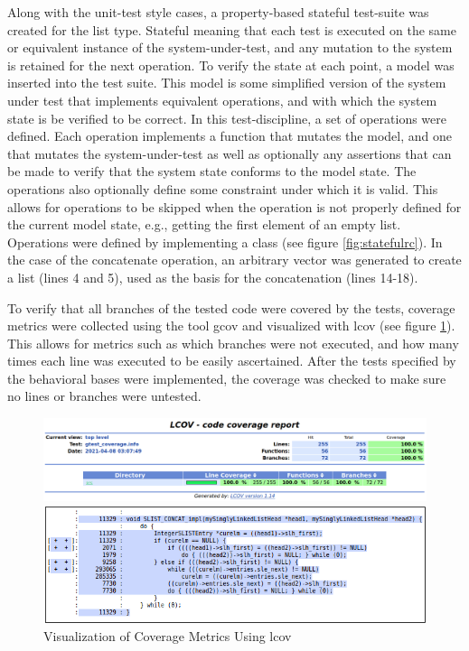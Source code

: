 Along with the unit-test style cases, a property-based stateful test-suite was created for the list type. Stateful meaning that each test is executed on the same or equivalent instance of the system-under-test, and any mutation to the system is retained for the next operation. To verify the state at each point, a model was inserted into the test suite. This model is some simplified version of the system under test that implements equivalent operations, and with which the system state is be verified to be correct. In this test-discipline, a set of operations were defined. Each operation implements a function that mutates the model, and one that mutates the system-under-test as well as optionally any assertions that can be made to verify that the system state conforms to the model state. The operations also optionally define some constraint under which it is valid. This allows for operations to be skipped when the operation is not properly defined for the current model state, e.g., getting the first element of an empty list. Operations were defined by implementing a class (see figure \ref{fig:statefulrc}). In the case of the concatenate operation, an arbitrary vector was generated to create a list (lines 4 and 5), used as the basis for the concatenation (lines 14-18).

To verify that all branches of the tested code were covered by the tests, coverage metrics were collected using the tool gcov and visualized with lcov (see figure \ref{fig:lcov}). This allows for metrics such as which branches were not executed, and how many times each line was executed to be easily ascertained. After the tests specified by the behavioral bases were implemented, the coverage was checked to make sure no lines or branches were untested.

\begin{figure}[H]
\centerline{\includegraphics[width=5in]{lcov_ui.png}}
\centerline{\includegraphics[width=5in]{lcov.png}}
\caption{Visualization of Coverage Metrics Using lcov}
\label{fig:lcov}
\end{figure}

